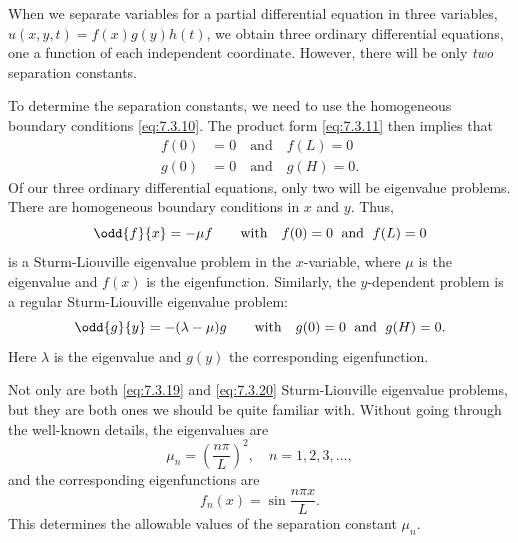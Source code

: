 When we separate variables for a partial differential equation in three variables, $u(x,y,t) = f(x)g(y)h(t)$, we obtain three ordinary differential equations, one a function of each independent coordinate.  However, there will be only \emph{two} separation constants.

To determine the separation constants, we need to use the homogeneous boundary conditions \eqref{eq:7.3.10}.  The product form \eqref{eq:7.3.11} then implies that
\begin{equation}
\begin{aligned}
f(0) &= 0 \quad\text{and}\quad f(L) = 0 \\
g(0) &= 0 \quad\text{and}\quad g(H) = 0.
\end{aligned}
\label{eq:7.3.18}
\end{equation}
Of our three ordinary differential equations, only two will be eigenvalue problems.  There are homogeneous boundary conditions in $x$ and $y$.  Thus,
\begin{equation}
\odd{f}{x} = -\mu f \qquad\text{with}\quad f(0) = 0 \;\text{ and }\; f(L) = 0
\label{eq:7.3.19}
\end{equation}
is a Sturm-Liouville eigenvalue problem in the $x$-variable, where $\mu$ is the eigenvalue and $f(x)$ is the eigenfunction.  Similarly, the $y$-dependent problem is a regular Sturm-Liouville eigenvalue problem:
\begin{equation}
\odd{g}{y} = -(\lambda - \mu)g \qquad\text{with}\quad g(0) = 0 \;\text{ and }\; g(H) = 0.
\label{eq:7.3.20}
\end{equation}
Here $\lambda$ is the eigenvalue and $g(y)$ the corresponding eigenfunction.

Not only are both \eqref{eq:7.3.19} and \eqref{eq:7.3.20} Sturm-Liouville eigenvalue problems, but they are both ones we should be quite familiar with.  Without going through the well-known details, the eigenvalues are
\begin{equation}
\mu_n = \left(\frac{n\pi}{L}\right)^2, \quad n = 1, 2, 3, \ldots,
\label{eq:7.3.21}
\end{equation}
and the corresponding eigenfunctions are
\begin{equation}
f_n(x) = \sin\frac{n\pi x}{L}.
\label{eq:7.3.22}
\end{equation}
This determines the allowable values of the separation constant $\mu_n$.

